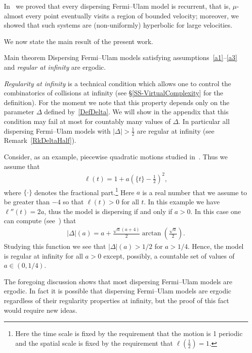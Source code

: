 \documentclass[AHL, Unicode, longabstracts,published]{cedram}
\newcommand{\ifrac}[2]{#1/#2}
\begin{document}
In~\cite{fum} we proved that every dispersing Fermi--Ulam model is recurrent, that is, $\mu$-almost every point eventually visits a region of bounded velocity; moreover, we showed that such systems are (non-uniformly) hyperbolic for large velocities.

We now state the main result of the present work.

\begin{enonce*}[plain]{Main theorem}
Dispersing Fermi--Ulam models satisfying assumptions~\eqref{a1}--\eqref{a3} and
\emph{regular at infinity} are ergodic.
\end{enonce*}


\emph{Regularity at infinity} is a technical condition which allows one to control the combinatorics of collisions at infinity (see
\S\ref{SS-VirtualComplexity} for the definition). For the moment we note that this property depends only on the parameter $\Delta$ defined by~\eqref{DefDelta}. We will show in the appendix that this condition may fail at most for countably many values of $\Delta$. In particular all dispersing Fermi--Ulam models with $|\Delta|>\frac{1}{2}$ are regular at infinity (see Remark~\ref{RkDeltaHalf}).

Consider, as an example, piecewise quadratic motions studied in~\cite{U}. Thus we assume that
\begin{align*}
\ell(t)=1+a \left(\{t\}-\frac{1}{2}\right)^2,
\end{align*}
where $\{\cdot\}$ denotes the fractional part.\footnote{Here the time scale is fixed by the requirement that the motion is 1 periodic and the spatial scale is fixed by the requirement that $\ell(\frac{1}{2})=1.$} Here $a$ is a real number that we assume to be greater than $-4$ so that $\ell(t)>0$ for all $t$. In this example we have $\ell''(t) = 2a$, thus the model is dispersing if and only if $a>0$. In this case one can compute (see~\cite[Example~1.1]{fum}) that
\begin{align*}
|\Delta|(a)=a+\frac{\sqrt{a} (a+4)}{2} \arctan\left(\frac{\sqrt{a}}{2}\right).
\end{align*}
Studying this function we see that $|\Delta|(a)>\ifrac{1}{2}$ for $a>\ifrac{1}{4}$. Hence, the model is regular at infinity for all $a>0$ except, possibly, a countable set of values of $ a\in \left(0, \ifrac{1}{4}\right).$

The foregoing discussion shows that most dispersing Fermi--Ulam models are ergodic. In fact it is possible that dispersing Fermi--Ulam models are ergodic regardless of their regularity properties at infinity, but the proof of this fact would require new ideas.
\end{document}
